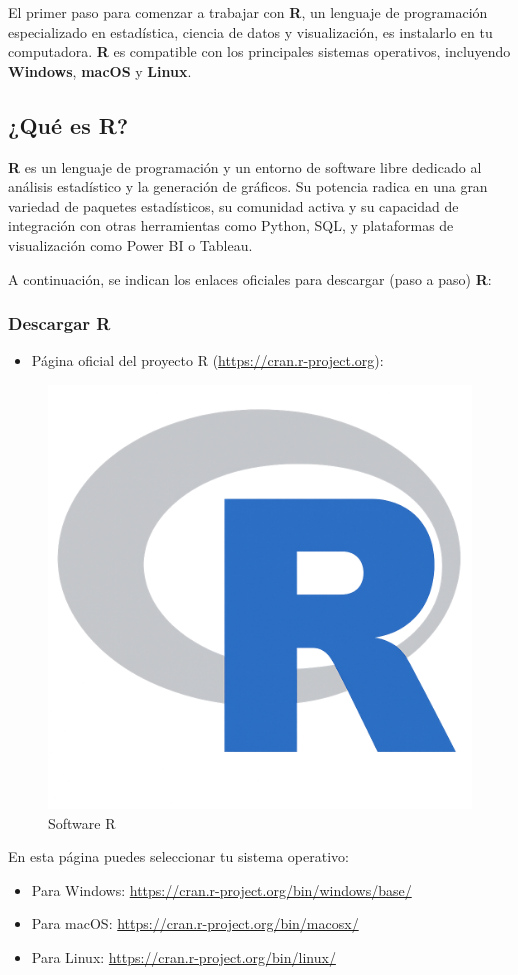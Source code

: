 \documentclass[
]{book}
\providecommand{\tightlist}{%
  \setlength{\itemsep}{0pt}\setlength{\parskip}{0pt}}
\begin{document}
El primer paso para comenzar a trabajar con \textbf{R}, un lenguaje de programación especializado en estadística, ciencia de datos y visualización, es instalarlo en tu computadora. \textbf{R} es compatible con los principales sistemas operativos, incluyendo \textbf{Windows}, \textbf{macOS} y \textbf{Linux}.

\subsection{¿Qué es R?}\label{quuxe9-es-r}

\textbf{R} es un lenguaje de programación y un entorno de software libre dedicado al análisis estadístico y la generación de gráficos. Su potencia radica en una gran variedad de paquetes estadísticos, su comunidad activa y su capacidad de integración con otras herramientas como Python, SQL, y plataformas de visualización como Power BI o Tableau.

A continuación, se indican los enlaces oficiales para descargar (paso a paso) \textbf{R}:

\subsubsection*{Descargar R}\label{descargar-r}

\begin{itemize}
\tightlist
\item
  Página oficial del proyecto R (\url{https://cran.r-project.org}):
\end{itemize}

\begin{figure}

{\centering \includegraphics[width=0.3\linewidth]{images/rsinfondo} 

}

\caption{Software R}\label{fig:rsinfondo}
\end{figure}

En esta página puedes seleccionar tu sistema operativo:

\begin{itemize}
\tightlist
\item
  Para Windows: \url{https://cran.r-project.org/bin/windows/base/}
\item
  Para macOS: \url{https://cran.r-project.org/bin/macosx/}
\item
  Para Linux: \url{https://cran.r-project.org/bin/linux/}
\end{itemize}
\end{document}
